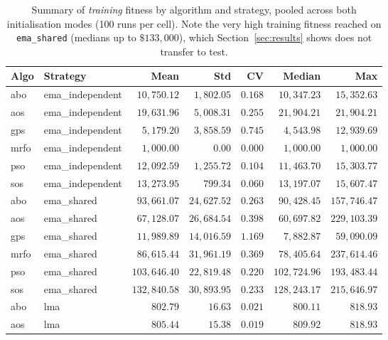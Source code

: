 \begin{table}[ht]
\centering
\caption{\label{tab:perf_train}%
Summary of \emph{training} fitness by algorithm and strategy, pooled across
both initialisation modes (100 runs per cell). Note the very high training
fitness reached on \texttt{ema\_shared} (medians up to $\$133{,}000$), which
Section~\ref{sec:results} shows does not transfer to test.}
\small
\begin{tabular}{llrrrrr}
\toprule
\textbf{Algo} & \textbf{Strategy} & \textbf{Mean} & \textbf{Std} & \textbf{CV} & \textbf{Median} & \textbf{Max} \\
\midrule
abo  & ema\_independent & $10{,}750.12$ & $1{,}802.05$ & $0.168$ & $10{,}347.23$ & $15{,}352.63$ \\
aos  & ema\_independent & $19{,}631.96$ & $5{,}008.31$ & $0.255$ & $21{,}904.21$ & $21{,}904.21$ \\
gps  & ema\_independent & $5{,}179.20$  & $3{,}858.59$ & $0.745$ & $4{,}543.98$  & $12{,}939.69$ \\
mrfo & ema\_independent & $1{,}000.00$  & $0.00$       & $0.000$ & $1{,}000.00$  & $1{,}000.00$  \\
pso  & ema\_independent & $12{,}092.59$ & $1{,}255.72$ & $0.104$ & $11{,}463.70$ & $15{,}303.77$ \\
sos  & ema\_independent & $13{,}273.95$ & $799.34$     & $0.060$ & $13{,}197.07$ & $15{,}607.47$ \\
\midrule
abo  & ema\_shared      & $93{,}661.07$  & $24{,}627.52$ & $0.263$ & $90{,}428.45$  & $157{,}746.47$ \\
aos  & ema\_shared      & $67{,}128.07$  & $26{,}684.54$ & $0.398$ & $60{,}697.82$  & $229{,}103.39$ \\
gps  & ema\_shared      & $11{,}989.89$  & $14{,}016.59$ & $1.169$ & $7{,}882.87$   & $59{,}090.09$  \\
mrfo & ema\_shared      & $86{,}615.44$  & $31{,}961.19$ & $0.369$ & $78{,}405.64$  & $237{,}614.46$ \\
pso  & ema\_shared      & $103{,}646.40$ & $22{,}819.48$ & $0.220$ & $102{,}724.96$ & $193{,}483.44$ \\
sos  & ema\_shared      & $132{,}840.58$ & $30{,}893.95$ & $0.233$ & $128{,}243.17$ & $215{,}646.97$ \\
\midrule
abo  & lma             & $802.79$ & $16.63$  & $0.021$ & $800.11$ & $818.93$ \\
aos  & lma             & $805.44$ & $15.38$  & $0.019$ & $809.92$ & $818.93$ \\

\end{tabular}
\end{table}
